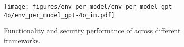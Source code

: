 
\begin{figure}[h]
    \centering
    \texttt{[image: figures/env\_per\_model/env\_per\_model\_gpt-4o/env\_per\_model\_gpt-4o\_im.pdf]}
    \caption{Functionality and security performance of \gptfo{} across different frameworks.}
    \label{fig:env_per_model_gpt-4o}
\end{figure}
